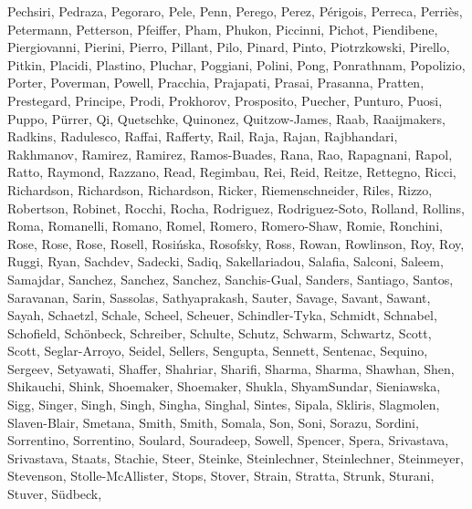 \documentclass[times,tight]{aastex631}
\begin{document}
\begin{thebibliography}{}
{  {Pechsiri}, {Pedraza}, {Pegoraro}, {Pele}, {Penn}, {Perego}, {Perez},
  {P{\'e}rigois}, {Perreca}, {Perri{\`e}s}, {Petermann}, {Petterson},
  {Pfeiffer}, {Pham}, {Phukon}, {Piccinni}, {Pichot}, {Piendibene},
  {Piergiovanni}, {Pierini}, {Pierro}, {Pillant}, {Pilo}, {Pinard}, {Pinto},
  {Piotrzkowski}, {Pirello}, {Pitkin}, {Placidi}, {Plastino}, {Pluchar},
  {Poggiani}, {Polini}, {Pong}, {Ponrathnam}, {Popolizio}, {Porter},
  {Poverman}, {Powell}, {Pracchia}, {Prajapati}, {Prasai}, {Prasanna},
  {Pratten}, {Prestegard}, {Principe}, {Prodi}, {Prokhorov}, {Prosposito},
  {Puecher}, {Punturo}, {Puosi}, {Puppo}, {P{\"u}rrer}, {Qi}, {Quetschke},
  {Quinonez}, {Quitzow-James}, {Raab}, {Raaijmakers}, {Radkins}, {Radulesco},
  {Raffai}, {Rafferty}, {Rail}, {Raja}, {Rajan}, {Rajbhandari}, {Rakhmanov},
  {Ramirez}, {Ramirez}, {Ramos-Buades}, {Rana}, {Rao}, {Rapagnani}, {Rapol},
  {Ratto}, {Raymond}, {Razzano}, {Read}, {Regimbau}, {Rei}, {Reid}, {Reitze},
  {Rettegno}, {Ricci}, {Richardson}, {Richardson}, {Richardson}, {Ricker},
  {Riemenschneider}, {Riles}, {Rizzo}, {Robertson}, {Robinet}, {Rocchi},
  {Rocha}, {Rodriguez}, {Rodriguez-Soto}, {Rolland}, {Rollins}, {Roma},
  {Romanelli}, {Romano}, {Romel}, {Romero}, {Romero-Shaw}, {Romie}, {Ronchini},
  {Rose}, {Rose}, {Rose}, {Rosell}, {Rosi{\'n}ska}, {Rosofsky}, {Ross},
  {Rowan}, {Rowlinson}, {Roy}, {Roy}, {Ruggi}, {Ryan}, {Sachdev}, {Sadecki},
  {Sadiq}, {Sakellariadou}, {Salafia}, {Salconi}, {Saleem}, {Samajdar},
  {Sanchez}, {Sanchez}, {Sanchez}, {Sanchis-Gual}, {Sanders}, {Santiago},
  {Santos}, {Saravanan}, {Sarin}, {Sassolas}, {Sathyaprakash}, {Sauter},
  {Savage}, {Savant}, {Sawant}, {Sayah}, {Schaetzl}, {Schale}, {Scheel},
  {Scheuer}, {Schindler-Tyka}, {Schmidt}, {Schnabel}, {Schofield},
  {Sch{\"o}nbeck}, {Schreiber}, {Schulte}, {Schutz}, {Schwarm}, {Schwartz},
  {Scott}, {Scott}, {Seglar-Arroyo}, {Seidel}, {Sellers}, {Sengupta},
  {Sennett}, {Sentenac}, {Sequino}, {Sergeev}, {Setyawati}, {Shaffer},
  {Shahriar}, {Sharifi}, {Sharma}, {Sharma}, {Shawhan}, {Shen}, {Shikauchi},
  {Shink}, {Shoemaker}, {Shoemaker}, {Shukla}, {ShyamSundar}, {Sieniawska},
  {Sigg}, {Singer}, {Singh}, {Singh}, {Singha}, {Singhal}, {Sintes}, {Sipala},
  {Skliris}, {Slagmolen}, {Slaven-Blair}, {Smetana}, {Smith}, {Smith},
  {Somala}, {Son}, {Soni}, {Sorazu}, {Sordini}, {Sorrentino}, {Sorrentino},
  {Soulard}, {Souradeep}, {Sowell}, {Spencer}, {Spera}, {Srivastava},
  {Srivastava}, {Staats}, {Stachie}, {Steer}, {Steinke}, {Steinlechner},
  {Steinlechner}, {Steinmeyer}, {Stevenson}, {Stolle-McAllister}, {Stops},
  {Stover}, {Strain}, {Stratta}, {Strunk}, {Sturani}, {Stuver}, {S{\"u}dbeck},
}
\end{thebibliography}
\end{document}
